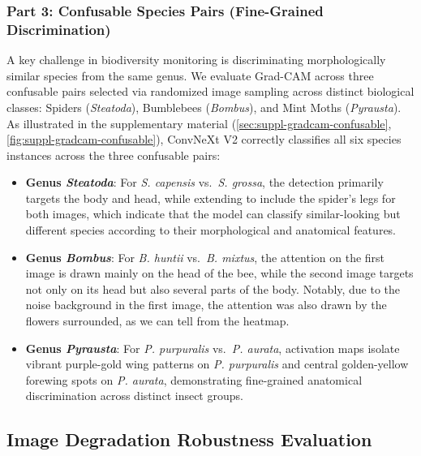 \subsubsection{Part 3: Confusable Species Pairs (Fine-Grained Discrimination)}
\label{sec:part3-confusable}

A key challenge in biodiversity monitoring is discriminating morphologically similar species from the same genus. We evaluate Grad-CAM across three confusable pairs selected via randomized image sampling across distinct biological classes: Spiders (\textit{Steatoda}), Bumblebees (\textit{Bombus}), and Mint Moths (\textit{Pyrausta}). As illustrated in the supplementary material (\cref{sec:suppl-gradcam-confusable}, \cref{fig:suppl-gradcam-confusable}), ConvNeXt V2 correctly classifies all six species instances across the three confusable pairs:
\begin{itemize}
  \item \textbf{Genus \textit{Steatoda}}: For \textit{S. capensis} vs.\ \textit{S. grossa}, the detection primarily targets the body and head, while extending to include the spider's legs for both images, which indicate that the model can classify similar-looking but different species according to their morphological and anatomical features.
  \item \textbf{Genus \textit{Bombus}}: For \textit{B. huntii} vs.\ \textit{B. mixtus}, the attention on the first image is drawn mainly on the head of the bee, while the second image targets not only on its head but also several parts of the body.
        Notably, due to the noise background in the first image, the attention was also drawn by the flowers surrounded, as we can tell from the heatmap.
  \item \textbf{Genus \textit{Pyrausta}}: For \textit{P. purpuralis} vs.\ \textit{P. aurata}, activation maps isolate vibrant purple-gold wing patterns on \textit{P. purpuralis} and central golden-yellow forewing spots on \textit{P. aurata}, demonstrating fine-grained anatomical discrimination across distinct insect groups.
\end{itemize}

\subsection{Image Degradation Robustness Evaluation}
\label{sec:robustness-eval}

